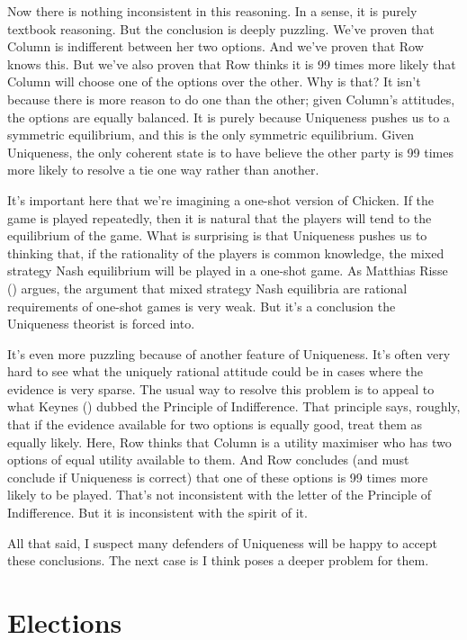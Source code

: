 \documentclass[
  12pt,
  letterpaper,
  DIV=11,
  numbers=noendperiod]{scrreprt}
\begin{document}
Now there is nothing inconsistent in this reasoning. In a sense, it is
purely textbook reasoning. But the conclusion is deeply puzzling. We've
proven that Column is indifferent between her two options. And we've
proven that Row knows this. But we've also proven that Row thinks it is
99 times more likely that Column will choose one of the options over the
other. Why is that? It isn't because there is more reason to do one than
the other; given Column's attitudes, the options are equally balanced.
It is purely because Uniqueness pushes us to a symmetric equilibrium,
and this is the only symmetric equilibrium. Given Uniqueness, the only
coherent state is to have believe the other party is 99 times more
likely to resolve a tie one way rather than another.

It's important here that we're imagining a one-shot version of Chicken.
If the game is played repeatedly, then it is natural that the players
will tend to the equilibrium of the game. What is surprising is that
Uniqueness pushes us to thinking that, if the rationality of the players
is common knowledge, the mixed strategy Nash equilibrium will be played
in a one-shot game. As Matthias Risse ()
argues, the argument that mixed strategy Nash equilibria are rational
requirements of one-shot games is very weak. But it's a conclusion the
Uniqueness theorist is forced into.

It's even more puzzling because of another feature of Uniqueness. It's
often very hard to see what the uniquely rational attitude could be in
cases where the evidence is very sparse. The usual way to resolve this
problem is to appeal to what Keynes ()
dubbed the Principle of Indifference. That principle says, roughly, that
if the evidence available for two options is equally good, treat them as
equally likely. Here, Row thinks that Column is a utility maximiser who
has two options of equal utility available to them. And Row concludes
(and must conclude if Uniqueness is correct) that one of these options
is 99 times more likely to be played. That's not inconsistent with the
letter of the Principle of Indifference. But it is inconsistent with the
spirit of it.

All that said, I suspect many defenders of Uniqueness will be happy to
accept these conclusions. The next case is I think poses a deeper
problem for them.

\section{Elections}\label{elections}
\end{document}
